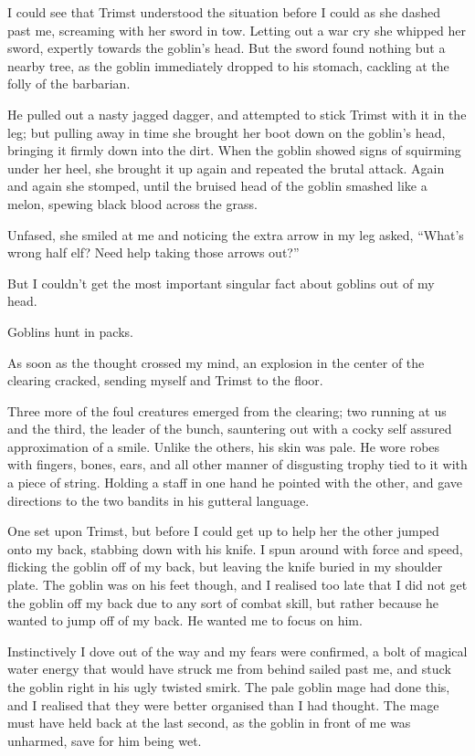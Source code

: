 \documentclass[12pt, a4paper]{book}
\begin{document}
I could see that Trimst understood the situation before I could as she dashed past me, screaming with her sword in tow. Letting out a war cry she whipped her sword, expertly towards the goblin's head. But the sword found nothing but a nearby tree, as the goblin immediately dropped to his stomach, cackling at the folly of the barbarian.

He pulled out a nasty jagged dagger, and attempted to stick Trimst with it in the leg; but pulling away in time she brought her boot down on the goblin's head, bringing it firmly down into the dirt. When the goblin showed signs of squirming under her heel, she brought it up again and repeated the brutal attack. Again and again she stomped, until the bruised head of the goblin smashed like a melon, spewing black blood across the grass.

Unfased, she smiled at me and noticing the extra arrow in my leg asked, ``What's wrong half elf? Need help taking those arrows out?''

But I couldn't get the most important singular fact about goblins out of my head.

Goblins hunt in packs.

As soon as the thought crossed my mind, an explosion in the center of the clearing cracked, sending myself and Trimst to the floor.

Three more of the foul creatures emerged from the clearing; two running at us and the third, the leader of the bunch, sauntering out with a cocky self assured approximation of a smile. Unlike the others, his skin was pale. He wore robes with fingers, bones, ears, and all other manner of disgusting trophy tied to it with a piece of string. Holding a staff in one hand he pointed with the other, and gave directions to the two bandits in his gutteral language. 

One set upon Trimst, but before I could get up to help her the other jumped onto my back, stabbing down with his knife. I spun around with force and speed, flicking the goblin off of my back, but leaving the knife buried in my shoulder plate. The goblin was on his feet though, and I realised too late that I did not get the goblin off my back due to any sort of combat skill, but rather because he wanted to jump off of my back. He wanted me to focus on him. 

Instinctively I dove out of the way and my fears were confirmed, a bolt of magical water energy that would have struck me from behind sailed past me, and stuck the goblin right in his ugly twisted smirk. The pale goblin mage had done this, and I realised that they were better organised than I had thought. The mage must have held back at the last second, as the goblin in front of me was unharmed, save for him being wet.
\end{document}
